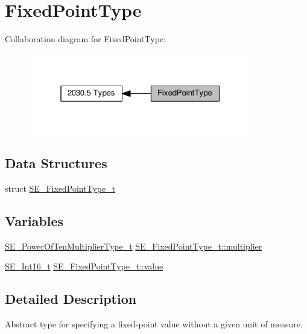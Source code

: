 \hypertarget{group__FixedPointType}{}\section{Fixed\+Point\+Type}
\label{group__FixedPointType}
Collaboration diagram for Fixed\+Point\+Type\+:\nopagebreak
\begin{figure}[H]
\begin{center}
\leavevmode
\includegraphics[width=277pt]{group__FixedPointType}
\end{center}
\end{figure}
\subsection*{Data Structures}
\begin{DoxyCompactItemize}
\item 
struct \hyperlink{structSE__FixedPointType__t}{S\+E\+\_\+\+Fixed\+Point\+Type\+\_\+t}
\end{DoxyCompactItemize}
\subsection*{Variables}
\begin{DoxyCompactItemize}
\item 
\hyperlink{group__PowerOfTenMultiplierType_gaf0317b781dc8dbb9cb6ac4e44a14fdef}{S\+E\+\_\+\+Power\+Of\+Ten\+Multiplier\+Type\+\_\+t} \hyperlink{group__FixedPointType_ga96ce7caa60a292e7113993d3b20f3516}{S\+E\+\_\+\+Fixed\+Point\+Type\+\_\+t\+::multiplier}
\item 
\hyperlink{group__Int16_ga0d600c7df811a7d4b4816e8965877690}{S\+E\+\_\+\+Int16\+\_\+t} \hyperlink{group__FixedPointType_ga01947846b0d854d8942dacb03cf532cc}{S\+E\+\_\+\+Fixed\+Point\+Type\+\_\+t\+::value}
\end{DoxyCompactItemize}


\subsection{Detailed Description}
Abstract type for specifying a fixed-\/point value without a given unit of measure. 

